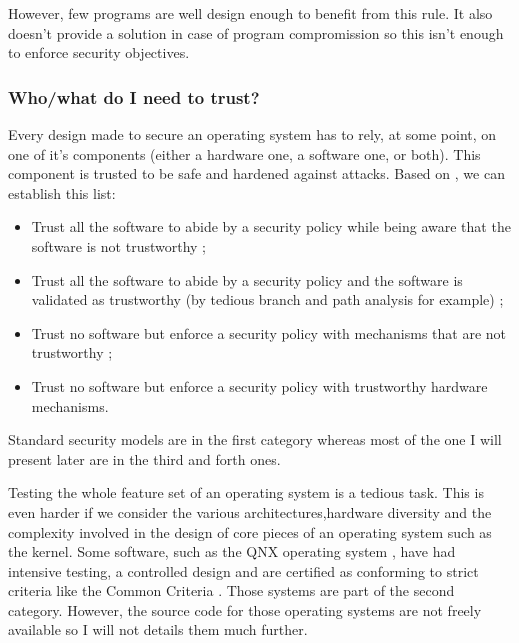 \documentclass[pdftex,a4paper,titlepage,11pt]{article}
\begin{document}
\bigskip

However, few programs are well design enough to benefit from this rule. It also doesn't provide a solution in case of program compromission so this isn't enough to enforce security objectives.


\subsubsection{Who/what do I need to trust?}

Every design made to secure an operating system has to rely, at some point, on one of it's components (either a hardware one, a software one, or both). This component is trusted to be safe and hardened against attacks. Based on \cite{WCS}, we can establish this list:

\begin{itemize}
	\item Trust all the software to abide by a security policy while being aware that the software is not trustworthy ;

	\item Trust all the software to abide by a security policy and the software is validated as trustworthy (by tedious branch and path analysis for example) ;

	\item Trust no software but enforce a security policy with mechanisms that are not trustworthy ;

	\item Trust no software but enforce a security policy with trustworthy hardware mechanisms.
\end{itemize}

\smallskip

Standard security models are in the first category whereas most of the one I will present later are in the third and forth ones.

\bigskip

Testing the whole feature set of an operating system is a tedious task. This is even harder if we consider the various architectures,hardware diversity and the complexity involved in the design of core pieces of an operating system such as the kernel. Some software, such as the QNX operating system \cite{QNX}, have had intensive testing, a controlled design and are certified as conforming to strict criteria like the Common Criteria \cite{CCCERT}. Those systems are part of the second category. However, the source code for those operating systems are not freely available so I will not details them much further.
\end{document}
